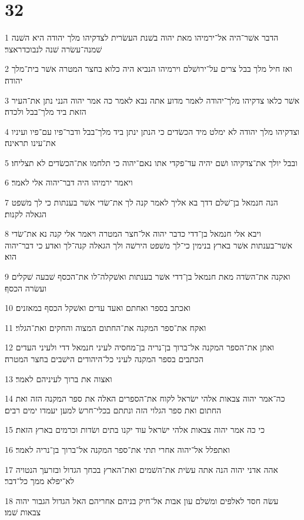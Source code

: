 \chapter{32}

\par 1 הדבר אשׁר־היה אל־ירמיהו מאת יהוה בשׁנת העשׂרית לצדקיהו מלך יהודה היא השׁנה שׁמנה־עשׂרה שׁנה לנבוכדראצר׃
\par 2 ואז חיל מלך בבל צרים על־ירושׁלם וירמיהו הנביא היה כלוא בחצר המטרה אשׁר בית־מלך יהודה׃
\par 3 אשׁר כלאו צדקיהו מלך־יהודה לאמר מדוע אתה נבא לאמר כה אמר יהוה הנני נתן את־העיר הזאת ביד מלך־בבל ולכדה׃
\par 4 וצדקיהו מלך יהודה לא ימלט מיד הכשׂדים כי הנתן ינתן ביד מלך־בבל ודבר־פיו עם־פיו ועיניו את־עינו תראינה׃
\par 5 ובבל יולך את־צדקיהו ושׁם יהיה עד־פקדי אתו נאם־יהוה כי תלחמו את־הכשׂדים לא תצליחו׃
\par 6 ויאמר ירמיהו היה דבר־יהוה אלי לאמר׃
\par 7 הנה חנמאל בן־שׁלם דדך בא אליך לאמר קנה לך את־שׂדי אשׁר בענתות כי לך משׁפט הגאלה לקנות׃
\par 8 ויבא אלי חנמאל בן־דדי כדבר יהוה אל־חצר המטרה ויאמר אלי קנה נא את־שׂדי אשׁר־בענתות אשׁר בארץ בנימין כי־לך משׁפט הירשׁה ולך הגאלה קנה־לך ואדע כי דבר־יהוה הוא׃
\par 9 ואקנה את־השׂדה מאת חנמאל בן־דדי אשׁר בענתות ואשׁקלה־לו את־הכסף שׁבעה שׁקלים ועשׂרה הכסף׃
\par 10 ואכתב בספר ואחתם ואעד עדים ואשׁקל הכסף במאזנים׃
\par 11 ואקח את־ספר המקנה את־החתום המצוה והחקים ואת־הגלוי׃
\par 12 ואתן את־הספר המקנה אל־ברוך בן־נריה בן־מחסיה לעיני חנמאל דדי ולעיני העדים הכתבים בספר המקנה לעיני כל־היהודים הישׁבים בחצר המטרה׃
\par 13 ואצוה את ברוך לעיניהם לאמר׃
\par 14 כה־אמר יהוה צבאות אלהי ישׂראל לקוח את־הספרים האלה את ספר המקנה הזה ואת החתום ואת ספר הגלוי הזה ונתתם בכלי־חרשׂ למען יעמדו ימים רבים׃
\par 15 כי כה אמר יהוה צבאות אלהי ישׂראל עוד יקנו בתים ושׂדות וכרמים בארץ הזאת׃
\par 16 ואתפלל אל־יהוה אחרי תתי את־ספר המקנה אל־ברוך בן־נריה לאמר׃
\par 17 אהה אדני יהוה הנה אתה עשׂית את־השׁמים ואת־הארץ בכחך הגדול ובזרעך הנטויה לא־יפלא ממך כל־דבר׃
\par 18 עשׂה חסד לאלפים ומשׁלם עון אבות אל־חיק בניהם אחריהם האל הגדול הגבור יהוה צבאות שׁמו׃
